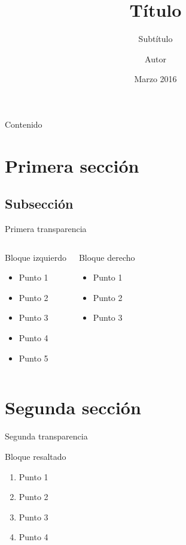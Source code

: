 \documentclass{beamer}
\title{T\'i{}tulo}
\subtitle{Subt\'i{}tulo}
\author{Autor}
\institute[NPSE]{%
  \href{https://www.facebook.com/nullapoliticasineethica}{NullaPoliticaSineEthica}
}
\date[03/2016]{Marzo 2016}
\begin{document}
\begin{frame}[plain]
  \titlepage
\end{frame}

\begin{frame}[plain]{Contenido}
  \tableofcontents[hideallsubsections]
\end{frame}

\section{Primera secci\'on}

\subsection{Subsecci\'on}

\begin{frame}{Primera transparencia}
	\begin{columns}[t]
		\begin{block}{Bloque izquierdo}
			\begin{itemize}
				\item Punto 1
				\item Punto 2
				\item Punto 3
				\item Punto 4				
				\item Punto 5
			\end{itemize}
		\end{block}
		\pause

		\begin{block}{Bloque derecho}
			\begin{itemize}
				\item Punto 1
				\item Punto 2
				\item Punto 3
			\end{itemize}
		\end{block}
	\end{columns}
\end{frame}

\section{Segunda secci\'on}

\begin{frame}{Segunda transparencia}
  \begin{alertblock}{Bloque resaltado}
  \begin{enumerate}
    \item Punto 1
    \item Punto 2
    \item Punto 3
    \item Punto 4
  \end{enumerate}
  \end{alertblock}
\end{frame}
\end{document}
